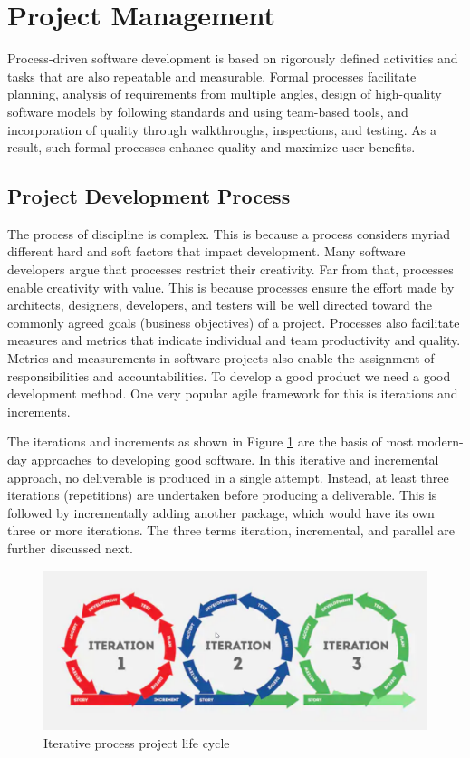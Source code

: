\section{ Project Management }
Process-driven software development is based on rigorously defined activities and tasks that are also repeatable and measurable. Formal processes facilitate planning, analysis of requirements from multiple angles, design of high-quality software models by following standards and using team-based tools, and incorporation of quality through walkthroughs, inspections, and testing.
As a result, such formal processes enhance quality and maximize user benefits.

\subsection{ Project Development Process }
The process of discipline is complex. This is because a process considers myriad different hard and soft factors that impact development. Many software developers argue that processes restrict their creativity. Far from that, processes enable creativity with value. This is because processes ensure the effort made by architects, designers, developers, and testers will be well directed toward the commonly agreed goals (business objectives) of a project. Processes also facilitate measures and metrics that indicate individual and team productivity and quality. Metrics and measurements in software projects also enable the assignment of responsibilities and accountabilities.
To develop a good product we need a good development method. One very popular agile framework for this is iterations and increments.

The iterations and increments as shown in Figure \ref{fig:iterationlifecycle} are the basis of most modern-day approaches to developing good software. In this iterative and incremental approach, no deliverable is produced in a single attempt. Instead, at least three iterations (repetitions) are undertaken before producing a deliverable.
This is followed by incrementally adding another package, which would have its own three or more iterations. The three terms iteration, incremental, and parallel are further discussed next.
\begin{figure}[!ht]
      \center
      \includegraphics[scale=0.40]{assets/iteration.png}
      \caption{Iterative process project life cycle}
      \label{fig:iterationlifecycle}
\end{figure}

